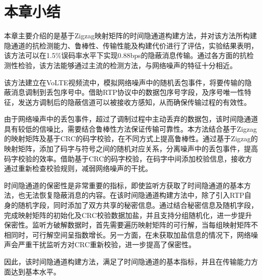 \section{本章小结}
\label{chap:zigzag:summary}

本章主要介绍的是基于Zigzag映射矩阵的时间隐通道构建方法，并对该方法所构建隐通道的抗检测能力、鲁棒性、传输性能及构建代价进行了评估，实验结果表明，该方法可以在1.5\%误码率水平下实现0.88bps的隐蔽消息传输。通过各方面的抗检测性检验，该方法能够通过主流的检测方法，与网络噪声的特征十分相近。

该方法建立在VoLTE视频流中，模拟网络噪声中的随机丢包事件，将要传输的隐蔽消息调制到丢包序号中。借助RTP协议中的数据包序号字段，及序号唯一性特征，发送方调制后的隐蔽信道可以被接收方感知，从而确保传输过程的有效性。

由于网络噪声中的丢包事件，超过了调制过程中主动丢弃的数据包，该时间隐通道具有较低的信噪比，需要结合鲁棒性方法保证传输可靠性。本方法结合基于Zigzag的映射矩阵及基于CRC的码字校验，在不同方式上提高鲁棒性。通过基于Zigzag的映射矩阵，添加了码字与符号之间的随机对应关系，分离噪声中的丢包事件，提高码字校验的效率。借助基于CRC的码字校验，在码字中间添加校验信息，接收方通过重新检查校验规则，减弱网络噪声的干扰。

时间隐通道的保密性是非常重要的指标，即使监听方获取了时间隐通道的基本方法，也无法恢复隐蔽消息的内容。在该时间隐通道构建方法中，除了引入RTP自身的随机字段，同时添加了双方共享的秘密信息。通过结合秘密信息及随机字段，完成映射矩阵的初始化及CRC校验数据加盐，并且支持分组随机化，进一步提升保密性。监听方破解数据时，首先需要遍历映射矩阵的可行解，当每组映射矩阵不相同时，可行解空间呈指数增长。另一方面，在未获取加盐信息的情况下，网络噪声会严重干扰监听方对CRC重新校验，进一步提高了保密性。

因此，该时间隐通道构建方法，满足了时间隐通道的基本指标，并且在传输能力方面达到基本水平。